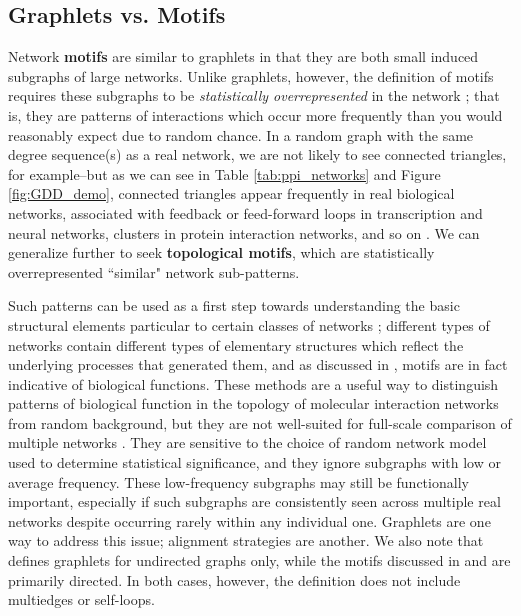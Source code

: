 \documentclass[12pt]{thesis}
\theoremstyle{plain}
\theoremstyle{definition}
\theoremstyle{remark}
\begin{document}
\subsection{Graphlets vs. Motifs}

Network \textbf{motifs} are similar to graphlets in that they are both small induced subgraphs of large networks. Unlike graphlets, however, the definition of motifs requires these subgraphs to be \textit{statistically overrepresented} in the network \cite{Milo_2002}; that is, they are patterns of interactions which occur more frequently than you would reasonably expect due to random chance. In a random graph with the same degree sequence(s) as a real network, we are not likely to see connected triangles, for example--but as we can see in Table \ref{tab:ppi_networks} and Figure \ref{fig:GDD_demo}, connected triangles appear frequently in real biological networks, associated with feedback or feed-forward loops in transcription and neural networks, clusters in protein interaction networks, and so on \cite{Berg_2004}. We can generalize further to seek \textbf{topological motifs}, which are statistically overrepresented ``similar" network sub-patterns. 

Such patterns can be used as a first step towards understanding the basic structural elements particular to certain classes of networks \cite{Milo_2002}; different types of networks contain different types of elementary structures which reflect the underlying processes that generated them, and as discussed in \cite{Berg_2004}, motifs are in fact indicative of biological functions. These methods are a useful way to distinguish patterns of biological function in the topology of molecular interaction networks from random background, but they are not well-suited for full-scale comparison of multiple networks \cite{Przulj_2007}. They are sensitive to the choice of random network model used to determine statistical significance, and they ignore subgraphs with low or average frequency. These low-frequency subgraphs may still be functionally important, especially if such subgraphs are consistently seen across multiple real networks despite occurring rarely within any individual one. Graphlets are one way to address this issue; alignment strategies are another. We also note that \cite{Przulj_2007} defines graphlets for undirected graphs only, while the motifs discussed in \cite{Milo_2002} and \cite{Berg_2004} are primarily directed. In both cases, however, the definition does not include multiedges or self-loops.
\end{document}
